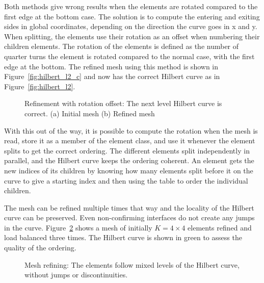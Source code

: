 Both methods give wrong results when the elements are rotated compared to the first edge at the
bottom case. The solution is to compute the entering and exiting sides in global coordinates,
depending on the direction the curve goes in x and y. When splitting, the elements use their
rotation as an offset when numbering their children elements. The rotation of the elements is
defined as the number of quarter turns the element is rotated compared to the normal case, with the
first edge at the bottom. The refined mesh using this method is shown in
Figure~\ref{fig:hilbert_l2_c} and now has the correct Hilbert curve as in
Figure~\ref{fig:hilbert_l2}.

\begin{figure}[H]
    \centering
    \hfill
    \caption{Refinement with rotation offset: The next level Hilbert curve is correct. (a) Initial mesh (b) Refined mesh}\label{fig:hilbert_correct}
\end{figure}

With this out of the way, it is possible to compute the rotation when the mesh is read, store it as
a member of the element class, and use it whenever the element splits to get the correct ordering.
The different elements split independently in parallel, and the Hilbert curve keeps the ordering
coherent. An element gets the new indices of its children by knowing how many elements split before
it on the curve to give a starting index and then using the table to order the individual children.

The mesh can be refined multiple times that way and the locality of the Hilbert curve can be
preserved. Even non-confirming interfaces do not create any jumps in the curve.
Figure~\ref{fig:mesh_1_after2} shows a mesh of initially \(K = 4 \times 4\) elements refined and
load balanced three times. The Hilbert curve is shown in green to assess the quality of the
ordering.

\begin{figure}[H]
    \centering
    
    \caption{Mesh refining: The elements follow mixed levels of the Hilbert curve, without jumps or discontinuities.}\label{fig:mesh_1_after2}
\end{figure}


